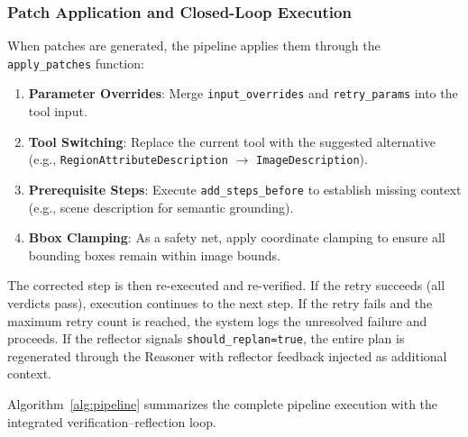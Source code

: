 \documentclass[journal]{IEEEtran}
\begin{document}
\subsubsection{Patch Application and Closed-Loop Execution}
When patches are generated, the pipeline applies them through the \texttt{apply\_patches} function:

\begin{enumerate}[leftmargin=*]
    \item \textbf{Parameter Overrides}: Merge \texttt{input\_overrides} and \texttt{retry\_params} into the tool input.
    \item \textbf{Tool Switching}: Replace the current tool with the suggested alternative (e.g., \texttt{RegionAttributeDescription} $\rightarrow$ \texttt{ImageDescription}).
    \item \textbf{Prerequisite Steps}: Execute \texttt{add\_steps\_before} to establish missing context (e.g., scene description for semantic grounding).
    \item \textbf{Bbox Clamping}: As a safety net, apply coordinate clamping to ensure all bounding boxes remain within image bounds.
\end{enumerate}

The corrected step is then re-executed and re-verified.
If the retry succeeds (all verdicts pass), execution continues to the next step.
If the retry fails and the maximum retry count is reached, the system logs the unresolved failure and proceeds.
If the reflector signals \texttt{should\_replan=true}, the entire plan is regenerated through the Reasoner with reflector feedback injected as additional context.

Algorithm~\ref{alg:pipeline} summarizes the complete pipeline execution with the integrated verification--reflection loop.
\end{document}
